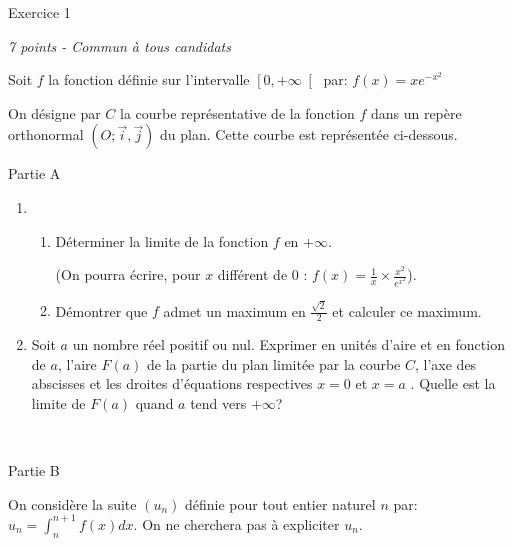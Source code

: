 
%
\begin{h2}Exercice 1\end{h2}
\textit{7 points - Commun à tous candidats }
\par
Soit $f$ la fonction définie sur l'intervalle $\left[0, + \infty \right[$ par: $f\left(x\right) = xe^{-x^{2}}$
\par
On désigne par $C$ la courbe représentative de la fonction $f$ dans un repère orthonormal $\left(O; \vec{i}, \vec{j}\right)$ du plan. Cette courbe est représentée ci-dessous.

\begin{center}
\end{center}
\begin{h3}Partie A\end{h3}
\begin{enumerate}
     \item 
     \begin{enumerate}[label=\alph*.]
          \item
          Déterminer la limite de la fonction $f$ en $+\infty $.
          \par
          (On pourra écrire, pour $x$ différent de 0 : $f\left(x\right) = \frac{1}{x}\times \frac{x^{2}}{e^{x^{2}}}$).
          \item
          Démontrer que $f$ admet un maximum en $\frac{\sqrt{2}}{2}$ et calculer ce maximum.
     \end{enumerate}
     \item
     Soit $a$ un nombre réel positif ou nul. Exprimer en unités d'aire et en fonction de $a$, l'aire $F\left(a\right)$ de la partie du plan limitée par la courbe $C$, l'axe des abscisses et les droites d'équations respectives $x=0$ et $x = a$ . Quelle est la limite de $F\left(a\right)$ quand $a$ tend vers $+\infty $?
\end{enumerate}
 
\begin{h3}Partie B\end{h3}
On considère la suite $\left(u_{n}\right)$ définie pour tout entier naturel $n$ par: $u_{n} = \int_{n}^{n+1}f\left(x\right)dx$. On ne cherchera pas à expliciter $u_{n}$.
